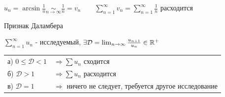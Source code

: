 \documentclass[12pt]{article}
\begin{document}
    $u_n = \arcsin \frac{1}{n} \underset{n \to \infty}{\sim} \frac{1}{n} = v_n \quad\quad \sum_{n = 1}^\infty v_n = \sum_{n = 1}^\infty \frac{1}{n}$ расходится

    \begin{MyTheorem}
         Признак Даламбера

        $\sum_{n = 1}^\infty u_n$ - исследуемый, $\exists \mathcal{D} = \lim_{n \to \infty} \frac{u_{n + 1}}{u_n} \in \mathbb{R}^+$

        \begin{tabular}{ll}
            а) $0 \leq \mathcal{D} < 1$ & $\Longrightarrow \sum u_n$ сходится                                \\

            б) $\mathcal{D} > 1$        & $\Longrightarrow \sum u_n$ расходится                              \\

            в) $\mathcal{D} = 1$        & $\Longrightarrow$ ничего не следует, требуется другое исследование \\
        \end{tabular}
    \end{MyTheorem}
\end{document}
